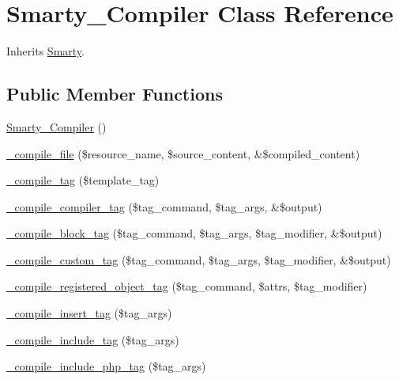 \hypertarget{class_smarty___compiler}{}\section{Smarty\+\_\+\+Compiler Class Reference}
\label{class_smarty___compiler}


Inherits \mbox{\hyperlink{class_smarty}{Smarty}}.

\subsection*{Public Member Functions}
\begin{DoxyCompactItemize}
\item 
\mbox{\hyperlink{class_smarty___compiler_ad6ab19d93f6afc09b6fa7a09947f7a20}{Smarty\+\_\+\+Compiler}} ()
\item 
\mbox{\hyperlink{class_smarty___compiler_acfef9359d4a045b3c17bb36c713d80dc}{\+\_\+compile\+\_\+file}} (\$resource\+\_\+name, \$source\+\_\+content, \&\$compiled\+\_\+content)
\item 
\mbox{\hyperlink{class_smarty___compiler_a2a8edf6c0079fb0fa53d98837f17ff8c}{\+\_\+compile\+\_\+tag}} (\$template\+\_\+tag)
\item 
\mbox{\hyperlink{class_smarty___compiler_a7436c858b44c88f75ac8e91480c778c1}{\+\_\+compile\+\_\+compiler\+\_\+tag}} (\$tag\+\_\+command, \$tag\+\_\+args, \&\$output)
\item 
\mbox{\hyperlink{class_smarty___compiler_aa2e5d024c2c566aa9baeb4636928de18}{\+\_\+compile\+\_\+block\+\_\+tag}} (\$tag\+\_\+command, \$tag\+\_\+args, \$tag\+\_\+modifier, \&\$output)
\item 
\mbox{\hyperlink{class_smarty___compiler_af172dbd373fed01b38c00d0afa8b2cbe}{\+\_\+compile\+\_\+custom\+\_\+tag}} (\$tag\+\_\+command, \$tag\+\_\+args, \$tag\+\_\+modifier, \&\$output)
\item 
\mbox{\hyperlink{class_smarty___compiler_ae513c736559da523560a8699db475881}{\+\_\+compile\+\_\+registered\+\_\+object\+\_\+tag}} (\$tag\+\_\+command, \$attrs, \$tag\+\_\+modifier)
\item 
\mbox{\hyperlink{class_smarty___compiler_a155076f7f3939480a7cbb17ae1b79d7d}{\+\_\+compile\+\_\+insert\+\_\+tag}} (\$tag\+\_\+args)
\item 
\mbox{\hyperlink{class_smarty___compiler_ad57897c82c75a0a37868853a544368d5}{\+\_\+compile\+\_\+include\+\_\+tag}} (\$tag\+\_\+args)
\item 
\mbox{\hyperlink{class_smarty___compiler_a92a50ae51f7da35e56d58065d2f880ef}{\+\_\+compile\+\_\+include\+\_\+php\+\_\+tag}} (\$tag\+\_\+args)

\end{DoxyCompactItemize}
